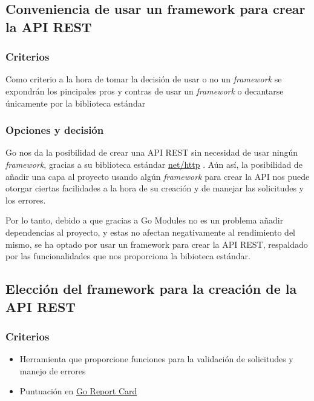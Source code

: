 \subsection{Conveniencia de usar un framework para crear la API REST}

\subsubsection{Criterios}

Como criterio a la hora de tomar la decisión de usar o no un \textit{framework} se expondrán los pincipales pros y contras de usar un \textit{framework} o decantarse únicamente por la biblioteca estándar

\subsubsection{Opciones y decisión}

Go nos da la posibilidad de crear una API REST sin necesidad de usar ningún \textit{framework}, gracias a su biblioteca estándar \href{https://pkg.go.dev/net/http}{net/http} \cite{go-dev}.
Aún así, la posibilidad de añadir una capa al proyecto usando algún \textit{framework} para crear la API nos puede otorgar ciertas facilidades a la hora de su creación y de manejar las solicitudes y los errores.

Por lo tanto, debido a que gracias a Go Modules no es un problema añadir dependencias al proyecto, y estas no afectan negativamente al rendimiento del mismo, se ha optado por usar
un framework para crear la API REST, respaldado por las funcionalidades que nos proporciona la bibioteca estándar.

\subsection{Elección del framework para la creación de la API REST}

\subsubsection{Criterios}

\begin{itemize}
\item
  Herramienta que proporcione funciones para la validación de solicitudes y manejo de errores
\item
  Puntuación en \href{https://goreportcard.com/}{Go Report Card} \cite{go-report-card}
\end{itemize}

